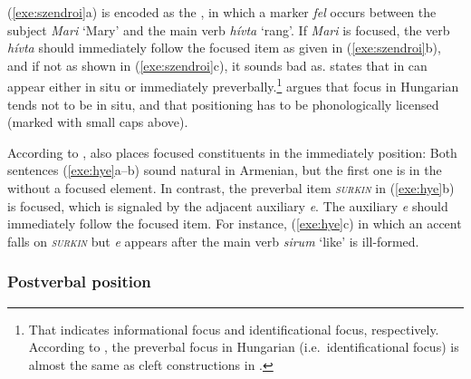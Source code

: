 \noindent (\ref{exe:szendroi}a) is encoded as the , in which a marker \textit{fel} occurs between the subject
\textit{Mari} `Mary' and the main verb \textit{h{\'i}vta} `rang'. If
\textit{Mari} is focused, the verb \textit{h{\'i}vta} should
immediately follow the focused item as given in (\ref{exe:szendroi}b),
and if not as shown in (\ref{exe:szendroi}c), it sounds bad
as. \citet{kiss:98} states that  in  can appear either
in situ or immediately preverbally.\footnote{That indicates
  informational focus and identificational focus,
  respectively. According to \citet{kiss:98}, the preverbal focus in
  Hungarian (i.e.\ identificational focus) is almost the same as cleft
  constructions in .} \citet{szendroi:01} argues
that focus in Hungarian tends not to be in situ, and that
 positioning has to be phonologically licensed (marked
with small caps above).


According to \citet{tamrazian:91},  also places focused
constituents in the immediately  position: Both sentences
(\ref{exe:hye}a--b) sound natural in Armenian, but the first one is in
the  without a focused element. In contrast, the
preverbal item \textit{\textsc{surkin}} in (\ref{exe:hye}b) is
focused, which is signaled by the adjacent auxiliary \textit{e}. The
auxiliary \textit{e} should immediately follow the focused item. For
instance, (\ref{exe:hye}c) in which an accent falls on
\textit{\textsc{surkin}} but \textit{e} appears after the main verb
\textit{sirum} `like' is ill-formed.




\subsubsection{Postverbal position}
\label{4:sssec:postverbal}


